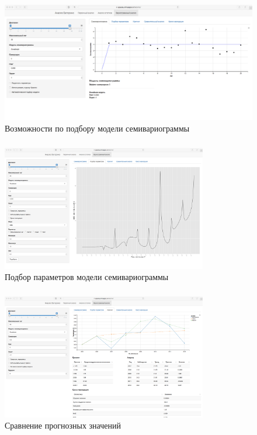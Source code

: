 \documentclass[notheorems]{beamer}
\theoremstyle{definition}
\theoremstyle{example}
\theoremstyle{plain}
\begin{document}
\begin{frame}
  \frametitle{\large\secname}
  \framesubtitle{\subsecname}
    \begin{figure}[h]
    \includegraphics[width=1\textwidth]{../../figures/static/4_variogram.png}
    \caption{Возможности по подбору модели семивариограммы}
  \end{figure}
\end{frame}

\begin{frame}
  \frametitle{\large\secname}
  \framesubtitle{\subsecname}
    \begin{figure}[h]
    \includegraphics[width=0.8\textwidth]{../../figures/static/5_fit.png}
    \caption{Подбор параметров модели семивариограммы}
  \end{figure}
\end{frame}

\begin{frame}
  \frametitle{\large\secname}
  \framesubtitle{\subsecname}
    \begin{figure}[h]
    \includegraphics[width=0.8\textwidth]{../../figures/static/6_krige.png}
    \caption{Сравнение прогнозных значений}
  \end{figure}
\end{frame}
\end{document}

